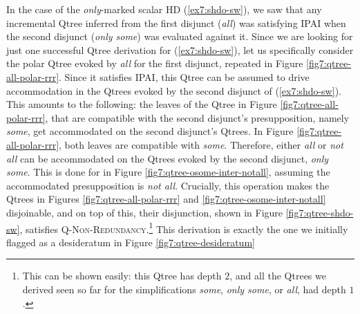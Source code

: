 In the case of the \textit{only}-marked scalar HD (\ref{ex7:shdo-sw}), we saw that any incremental Qtree inferred from the first disjunct (\textit{all}) was satisfying IPAI when the second disjunct (\textit{only some}) was evaluated against it. Since we are looking for just one successful Qtree derivation for (\ref{ex7:shdo-sw}), let us specifically consider the polar Qtree evoked by \textit{all} for the first disjunct, repeated in Figure \ref{fig7:qtree-all-polar-rrr}. Since it satisfies IPAI, this Qtree can be assumed to drive accommodation in the Qtrees evoked by the second disjunct of (\ref{ex7:shdo-sw}). This amounts to the following: the leaves of the Qtree in Figure \ref{fig7:qtree-all-polar-rrr}, that are compatible with the second disjunct's presupposition, namely \textit{some}, get accommodated on the second disjunct's Qtrees. In Figure \ref{fig7:qtree-all-polar-rrr}, both leaves are compatible with \textit{some}. Therefore, either \textit{all} or \textit{not all} can be accommodated on the Qtrees evoked by the second disjunct, \textit{only some}. This is done for in Figure \ref{fig7:qtree-osome-inter-notall}, assuming the accommodated presupposition is \textit{not all}. Crucially, this operation makes the Qtrees in Figures \ref{fig7:qtree-all-polar-rrr} and \ref{fig7:qtree-osome-inter-notall} disjoinable, and on top of this, their disjunction, shown in Figure \ref{fig7:qtree-shdo-sw}, satisfies \textsc{Q-Non-Redundancy}.\footnote{This can be shown easily: this Qtree has depth $2$, and all the Qtrees we derived seen so far for the simplifications \textit{some}, \textit{only some}, or \textit{all}, had depth $1$.} This derivation is exactly the one we initially flagged as a desideratum in Figure \ref{fig7:qtree-desideratum}


